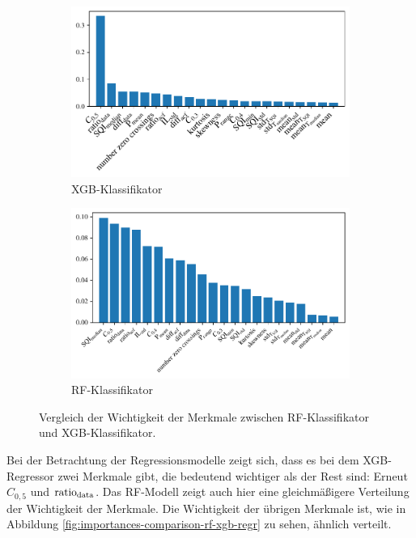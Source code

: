  \begin{figure}[h]
 	\centering
		\begin{subfigure}{.49\textwidth}
			\centering
 			\includegraphics[width=\textwidth]{pic/xgb-clf-final-importances.pdf}
 			\caption{\ac{XGB}-Klassifikator}
 		\end{subfigure}
    	\begin{subfigure}{.49\textwidth}
    		\centering
 			\includegraphics[width=\textwidth]{pic/rf-clf-final-importances.pdf}
 			\caption{\ac{RF}-Klassifikator}
 		\end{subfigure}
 	\caption{Vergleich der Wichtigkeit der Merkmale zwischen \ac{RF}-Klassifikator und \ac{XGB}-Klassifikator.}
 	\label{fig:importances-comparison-rf-xgb-clf}
 \end{figure}

Bei der Betrachtung der Regressionsmodelle zeigt sich, dass es bei dem \ac{XGB}-Regressor zwei Merkmale gibt, die bedeutend wichtiger als der Rest sind: Erneut $C_{0,5}$ und $\text{ratio}\textsubscript{data}$. Das \ac{RF}-Modell zeigt auch hier eine gleichmäßigere Verteilung der Wichtigkeit der Merkmale. Die Wichtigkeit der übrigen Merkmale ist, wie in Abbildung \ref{fig:importances-comparison-rf-xgb-regr} zu sehen, ähnlich verteilt.

